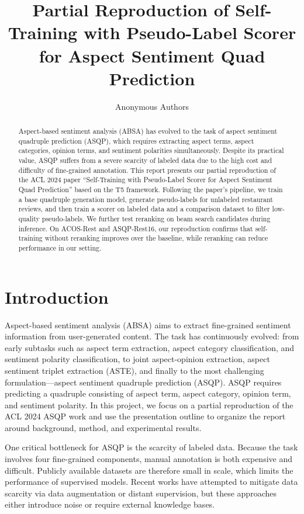\documentclass{article}
\title{Partial Reproduction of Self-Training with Pseudo-Label Scorer for Aspect Sentiment Quad Prediction}
\author{Anonymous Authors}
\begin{document}
\ifcolmsubmission
\linenumbers
\fi

\maketitle

\begin{abstract}
Aspect-based sentiment analysis (ABSA) has evolved to the task of aspect sentiment quadruple prediction (ASQP), which requires extracting aspect terms, aspect categories, opinion terms, and sentiment polarities simultaneously. Despite its practical value, ASQP suffers from a severe scarcity of labeled data due to the high cost and difficulty of fine-grained annotation. This report presents our partial reproduction of the ACL 2024 paper ``Self-Training with Pseudo-Label Scorer for Aspect Sentiment Quad Prediction'' \citep{zhang-etal-2024-self-training} based on the T5 framework. Following the paper's pipeline, we train a base quadruple generation model, generate pseudo-labels for unlabeled restaurant reviews, and then train a scorer on labeled data and a comparison dataset to filter low-quality pseudo-labels. We further test reranking on beam search candidates during inference. On ACOS-Rest and ASQP-Rest16, our reproduction confirms that self-training without reranking improves over the baseline, while reranking can reduce performance in our setting.
\end{abstract}

\section{Introduction}

Aspect-based sentiment analysis (ABSA) aims to extract fine-grained sentiment information from user-generated content. The task has continuously evolved: from early subtasks such as aspect term extraction, aspect category classification, and sentiment polarity classification, to joint aspect-opinion extraction, aspect sentiment triplet extraction (ASTE), and finally to the most challenging formulation---aspect sentiment quadruple prediction (ASQP). ASQP requires predicting a quadruple consisting of aspect term, aspect category, opinion term, and sentiment polarity. In this project, we focus on a partial reproduction of the ACL 2024 ASQP work and use the presentation outline to organize the report around background, method, and experimental results.

One critical bottleneck for ASQP is the scarcity of labeled data. Because the task involves four fine-grained components, manual annotation is both expensive and difficult. Publicly available datasets are therefore small in scale, which limits the performance of supervised models. Recent works have attempted to mitigate data scarcity via data augmentation or distant supervision, but these approaches either introduce noise or require external knowledge bases.
\end{document}

